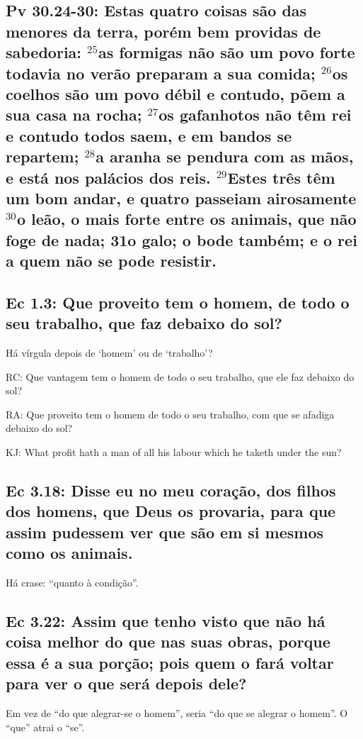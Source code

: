 \subsection{Pv 30.24-30: Estas quatro coisas são das menores da terra, porém bem providas de sabedoria: $^{\mathrm{25}}$as formigas não são um povo forte\uwave{;} todavia no verão preparam a sua comida; $^{\mathrm{26}}$os coelhos são um povo débil\uwave{;} e contudo, põem a sua casa na rocha; $^{\mathrm{27}}$os gafanhotos não têm rei\uwave{;} e contudo todos saem, e em bandos se repartem; $^{\mathrm{28}}$a aranha se pendura com as mãos, e está nos palácios dos reis. $^{\mathrm{29}}$Estes três têm um bom andar, e quatro passeiam airosamente\uwave{;} $^{\mathrm{30}}$o leão, o mais forte entre os animais, que não foge de nada; 31o galo; o bode também; e o rei a quem não se pode resistir.}


\subsection{Ec 1.3: Que proveito tem o homem, de todo o seu trabalho, que faz debaixo do sol?}
Há vírgula depois de `homem'  ou de `trabalho'?

RC: Que vantagem tem o homem de todo o seu trabalho, que ele faz debaixo do sol?

RA: Que proveito tem o homem de todo o seu trabalho, com que se afadiga debaixo do sol?

KJ: What profit hath a man of all his labour which he taketh under the sun?

\subsection{Ec 3.18: Disse eu no meu coração,  dos filhos dos homens, que Deus os provaria, para que assim pudessem ver que são em si mesmos como os animais.}

Há crase: ``quanto à condição''.

\subsection{Ec 3.22: Assim que tenho visto que não há coisa melhor do que  nas suas obras, porque essa é a sua porção; pois quem o fará voltar para ver o que será depois dele?}

 Em vez de ``do que alegrar-se o homem'', seria ``do que se alegrar o homem''. O ``que'' atrai o ``se''.

